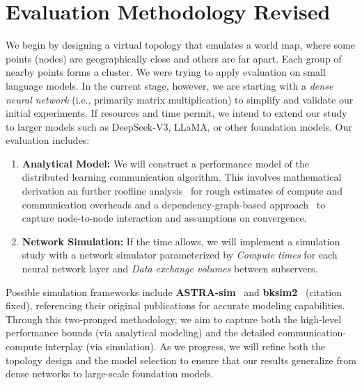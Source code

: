 \documentclass{article}
\begin{document}

\section{Evaluation Methodology Revised}

We begin by designing a virtual topology that emulates a world map, where some points (nodes) are geographically close and others are far apart. Each group of nearby points forms a cluster. We were trying to apply evaluation on small language models. In the current stage, however, we are starting with a \emph{dense neural network} (i.e., primarily matrix multiplication) to simplify and validate our initial experiments. If resources and time permit, we intend to extend our study to larger models such as DeepSeek-V3\cite{liu2024deepseek}, LLaMA\cite{touvron2023llama}, or other foundation models.
Our evaluation includes:

\begin{enumerate}
    \item \textbf{Analytical Model:} 
    We will construct a performance model of the distributed learning communication algorithm. 
    This involves mathematical derivation an further roofline analysis~\cite{scaling-book} for rough estimates of compute and communication overheads and a dependency-graph-based approach~\cite{neglia2019role} to capture node-to-node interaction and assumptions on convergence.
    
    \item \textbf{Network Simulation:} 
    If the time allows, we will implement a simulation study with a network simulator parameterized by \textit {Compute times} for each neural network layer and \textit{Data exchange volumes} between subservers.
\end{enumerate}

Possible simulation frameworks include \textbf{ASTRA-sim}~\cite{rashidi2020astra} and \textbf{bksim2}~\cite{jiang2013detailed} (citation fixed), referencing their original publications for accurate modeling capabilities.
Through this two-pronged methodology, we aim to capture both the high-level performance bounds (via analytical modeling) and the detailed communication-compute interplay (via simulation). As we progress, we will refine both the topology design and the model selection to ensure that our results generalize from dense networks to large-scale foundation models. 
\end{document}
